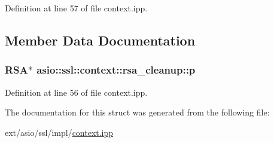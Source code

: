 Definition at line 57 of file context.\+ipp.



\subsection{Member Data Documentation}
\hypertarget{structasio_1_1ssl_1_1context_1_1rsa__cleanup_a2de2704a4b63e225df947ea6680bfab7}{}
\subsubsection[{p}]{\setlength{\rightskip}{0pt plus 5cm}R\+S\+A$\ast$ asio\+::ssl\+::context\+::rsa\+\_\+cleanup\+::p}\label{structasio_1_1ssl_1_1context_1_1rsa__cleanup_a2de2704a4b63e225df947ea6680bfab7}


Definition at line 56 of file context.\+ipp.



The documentation for this struct was generated from the following file\+:\begin{DoxyCompactItemize}
\item 
ext/asio/ssl/impl/\hyperlink{context_8ipp}{context.\+ipp}\end{DoxyCompactItemize}
